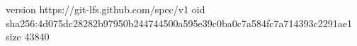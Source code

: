 version https://git-lfs.github.com/spec/v1
oid sha256:4d075dc28282b97950b244744500a595e39c0ba0c7a584fc7a714393c2291ae1
size 43840
